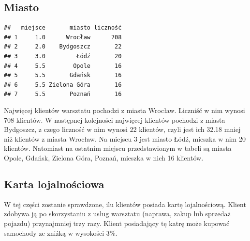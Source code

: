 \documentclass{article}\usepackage[]{graphicx}\usepackage[]{xcolor}
\makeatletter
\newenvironment{kframe}{%
 \def\at@end@of@kframe{}%
 \ifinner\ifhmode%
  \def\at@end@of@kframe{\end{minipage}}%
  \begin{minipage}{\columnwidth}%
 \fi\fi%
 \def\FrameCommand##1{\hskip\@totalleftmargin \hskip-\fboxsep
 \colorbox{shadecolor}{##1}\hskip-\fboxsep
     \hskip-\linewidth \hskip-\@totalleftmargin \hskip\columnwidth}%
 \MakeFramed {\advance\hsize-\width
   \@totalleftmargin\z@ \linewidth\hsize
   \@setminipage}}%
 {\par\unskip\endMakeFramed%
 \at@end@of@kframe}
\newenvironment{knitrout}{}{} %
\makeatother
\begin{document}
\subsection{Miasto}
\begin{knitrout}
\color{fgcolor}\begin{kframe}
\begin{verbatim}
##   miejsce       miasto liczność
## 1     1.0      Wrocław      708
## 2     2.0    Bydgoszcz       22
## 3     3.0         Łódź       20
## 4     5.5        Opole       16
## 5     5.5       Gdańsk       16
## 6     5.5 Zielona Góra       16
## 7     5.5       Poznań       16
\end{verbatim}
\end{kframe}
\end{knitrout}

Najwięcej klientów warsztatu pochodzi z miasta Wrocław. Liczniść w nim wynosi 708 klientów. W następnej kolejności najwięcej klientów pochodzi z miasta Bydgoszcz, z czego liczność w nim wynosi 22 klientów, czyli jest ich 32.18 mniej niż klientów z miasta Wrocław. Na miejscu 3 jest miasto Łódź, mieszka w nim 20 klientów. Natomiast na ostatnim miejscu przedstawionym w tabeli są miasta Opole, Gdańsk, Zielona Góra, Poznań, mieszka w nich 16 klientów.

\subsection{Karta lojalnościowa}

W tej części zostanie sprawdzone, ilu klientów posiada kartę lojalnościową. Klient zdobywa ją po skorzystaniu z usług warsztatu (naprawa, zakup lub sprzedaż pojazdu) przynajmniej trzy razy. Klient posiadający tę katrę może kupować samochody ze zniżką w wysokości 3\%.
\end{document}
